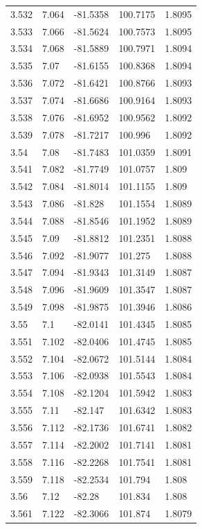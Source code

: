 \begin{tabular}{lllll}
3.532 & 7.064 & -81.5358 & 100.7175 & 1.8095 \\
3.533 & 7.066 & -81.5624 & 100.7573 & 1.8095 \\
3.534 & 7.068 & -81.5889 & 100.7971 & 1.8094 \\
3.535 & 7.07 & -81.6155 & 100.8368 & 1.8094 \\
3.536 & 7.072 & -81.6421 & 100.8766 & 1.8093 \\
3.537 & 7.074 & -81.6686 & 100.9164 & 1.8093 \\
3.538 & 7.076 & -81.6952 & 100.9562 & 1.8092 \\
3.539 & 7.078 & -81.7217 & 100.996 & 1.8092 \\
3.54 & 7.08 & -81.7483 & 101.0359 & 1.8091 \\
3.541 & 7.082 & -81.7749 & 101.0757 & 1.809 \\
3.542 & 7.084 & -81.8014 & 101.1155 & 1.809 \\
3.543 & 7.086 & -81.828 & 101.1554 & 1.8089 \\
3.544 & 7.088 & -81.8546 & 101.1952 & 1.8089 \\
3.545 & 7.09 & -81.8812 & 101.2351 & 1.8088 \\
3.546 & 7.092 & -81.9077 & 101.275 & 1.8088 \\
3.547 & 7.094 & -81.9343 & 101.3149 & 1.8087 \\
3.548 & 7.096 & -81.9609 & 101.3547 & 1.8087 \\
3.549 & 7.098 & -81.9875 & 101.3946 & 1.8086 \\
3.55 & 7.1 & -82.0141 & 101.4345 & 1.8085 \\
3.551 & 7.102 & -82.0406 & 101.4745 & 1.8085 \\
3.552 & 7.104 & -82.0672 & 101.5144 & 1.8084 \\
3.553 & 7.106 & -82.0938 & 101.5543 & 1.8084 \\
3.554 & 7.108 & -82.1204 & 101.5942 & 1.8083 \\
3.555 & 7.11 & -82.147 & 101.6342 & 1.8083 \\
3.556 & 7.112 & -82.1736 & 101.6741 & 1.8082 \\
3.557 & 7.114 & -82.2002 & 101.7141 & 1.8081 \\
3.558 & 7.116 & -82.2268 & 101.7541 & 1.8081 \\
3.559 & 7.118 & -82.2534 & 101.794 & 1.808 \\
3.56 & 7.12 & -82.28 & 101.834 & 1.808 \\
3.561 & 7.122 & -82.3066 & 101.874 & 1.8079 \\

\end{tabular}

